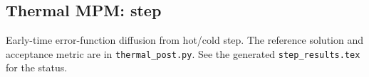 \subsection{Thermal MPM: step}
Early-time error-function diffusion from hot/cold step. The reference solution and acceptance metric are in \texttt{thermal\_post.py}. See the generated \texttt{step\_results.tex} for the status.
